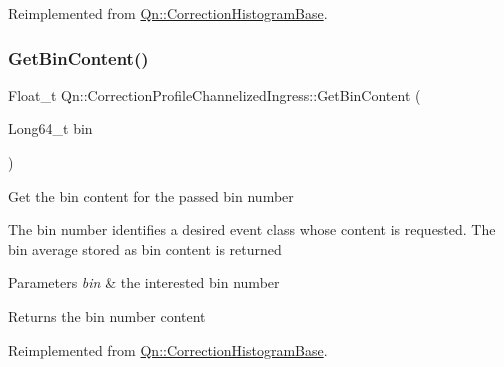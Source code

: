 Reimplemented from \mbox{\hyperlink{classQn_1_1CorrectionHistogramBase_acfde166908e4da950470841f21f87fb9}{Qn\+::\+Correction\+Histogram\+Base}}.

\mbox{\label{classQn_1_1CorrectionProfileChannelizedIngress_a64fbd6f89e6ddcb0ef22189e868594fa}} 
\subsubsection{\texorpdfstring{Get\+Bin\+Content()}{GetBinContent()}}
{\footnotesize\ttfamily Float\+\_\+t Qn\+::\+Correction\+Profile\+Channelized\+Ingress\+::\+Get\+Bin\+Content (\begin{DoxyParamCaption}\item[{Long64\+\_\+t}]{bin }\end{DoxyParamCaption})\hspace{0.3cm}{\ttfamily [virtual]}}

Get the bin content for the passed bin number

The bin number identifies a desired event class whose content is requested. The bin average stored as bin content is returned


\begin{DoxyParams}{Parameters}
{\em bin} & the interested bin number \\
\hline
\end{DoxyParams}
\begin{DoxyReturn}{Returns}
the bin number content 
\end{DoxyReturn}


Reimplemented from \mbox{\hyperlink{classQn_1_1CorrectionHistogramBase_a9e4e745a6f4cbebf5b9277d6d63bc9c7}{Qn\+::\+Correction\+Histogram\+Base}}.

\mbox{\label{classQn_1_1CorrectionProfileChannelizedIngress_ace03557cdc8d3f87637b0f4108308cc0}} 
